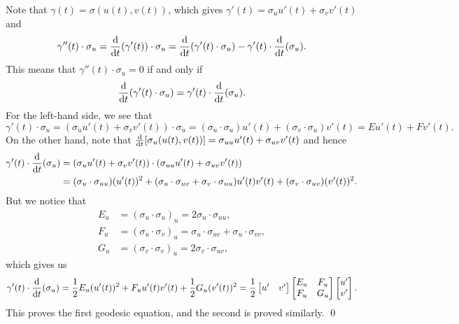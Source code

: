 \begin{pf} 
    Note that $\gamma(t) = \sigma(u(t), v(t))$, which gives 
    $\gamma'(t) = \sigma_u u'(t) + \sigma_v v'(t)$ and 
    \[ \gamma''(t) \cdot \sigma_u = \frac{\rm d}{{\rm d}t} (\gamma'(t)) \cdot \sigma_u 
    = \frac{\rm d}{{\rm d}t} (\gamma'(t) \cdot \sigma_u) - \gamma'(t) \cdot 
    \frac{\rm d}{{\rm d}t} (\sigma_u). \] 
    This means that $\gamma''(t) \cdot \sigma_u = 0$ if and only if 
    \[ \frac{\rm d}{{\rm d}t} (\gamma'(t) \cdot \sigma_u) = \gamma'(t) \cdot 
    \frac{\rm d}{{\rm d}t} (\sigma_u). \] 
    For the left-hand side, we see that 
    \[ \gamma'(t) \cdot \sigma_u = (\sigma_u u'(t) + \sigma_v v'(t))
    \cdot \sigma_u = (\sigma_u \cdot \sigma_u) u'(t) + (\sigma_v \cdot \sigma_u)v'(t) 
    = Eu'(t) + Fv'(t). \] 
    On the other hand, note that $\frac{{\rm d}}{{\rm d}t} [\sigma_u(u(t), v(t))]
    = \sigma_{uu} u'(t) + \sigma_{uv} v'(t)$ and hence 
    \begin{align*}
        \gamma'(t) \cdot \frac{\rm d}{{\rm d}t}(\sigma_u)
        &= (\sigma_u u'(t) + \sigma_v v'(t)) \cdot (\sigma_{uu} u'(t) + \sigma_{uv} v'(t)) \\ 
        &= (\sigma_u \cdot \sigma_{uu}) (u'(t))^2 + (\sigma_u \cdot \sigma_{uv} 
        + \sigma_v \cdot \sigma_{uu}) u'(t) v'(t) + (\sigma_v \cdot \sigma_{uv}) (v'(t))^2.
    \end{align*}
    But we notice that 
    \begin{align*}
        E_u &= (\sigma_u \cdot \sigma_u)_u = 2\sigma_u \cdot \sigma_{uu}, \\ 
        F_u &= (\sigma_u \cdot \sigma_v)_u = \sigma_u \cdot \sigma_{uv} + \sigma_u \cdot \sigma_{vv}, \\ 
        G_u &= (\sigma_v \cdot \sigma_v)_u = 2\sigma_v \cdot \sigma_{uv}, 
    \end{align*}
    which gives us  
    \[ \gamma'(t) \cdot \frac{\rm d}{{\rm d}t} (\sigma_u) = \frac12 E_u (u'(t))^2 
    + F_u u'(t)v'(t) + \frac12 G_u (v'(t))^2 = 
    \frac12 \begin{bmatrix}
        u' & v' 
    \end{bmatrix} \begin{bmatrix}
        E_u & F_u \\ F_u & G_u 
    \end{bmatrix} \begin{bmatrix}
        u' \\ v' 
    \end{bmatrix}. \] 
    This proves the first geodesic equation, and the second is proved similarly. \qed 
\end{pf}\vspace{-0.25cm}

